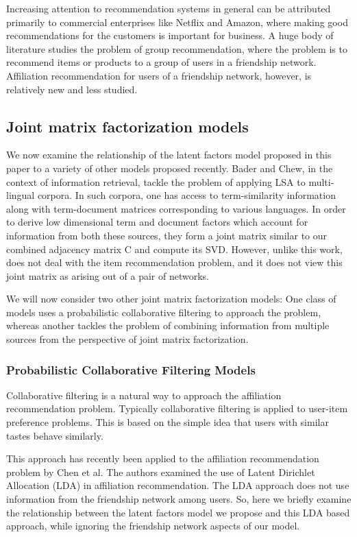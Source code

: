 Increasing attention to recommendation systems in general can be attributed primarily to commercial enterprises like Netflix and Amazon, where making good recommendations for the customers is important for business. A huge body of literature studies the problem of group recommendation, where the problem is to recommend items or products to a group of users in a friendship network.  Affiliation recommendation for users of a friendship network, however, is relatively new and less studied.

\subsection{Joint matrix factorization models}
We now examine the relationship of the latent factors model proposed in this paper to a variety of other models proposed recently. Bader and Chew\cite{baderChew08}, in the context of information retrieval, tackle the problem of applying LSA to multi-lingual corpora. In such corpora, one has access to term-similarity information along with term-document matrices corresponding to various languages. In order to derive low dimensional term and document factors which account for information from both these sources, they form a joint matrix similar to our combined adjacency matrix C and compute its SVD. However, unlike this work, \cite{baderChew08} does not deal with the item recommendation problem, and it does not view this joint matrix as arising out of a pair of networks.

We will now consider two other joint matrix factorization models: One class of models uses a probabilistic collaborative filtering to approach the problem, whereas another tackles the problem of combining information from multiple sources from the perspective of joint matrix factorization.

\subsubsection{Probabilistic Collaborative Filtering Models}
Collaborative filtering is a natural way to approach the affiliation recommendation problem. Typically collaborative filtering is applied to user-item preference problems. This is based on the simple idea that users with similar tastes behave similarly.

This approach has recently been applied to the affiliation recommendation problem by Chen et al\cite{GoogleCFLatent}. The authors examined the use of Latent Dirichlet Allocation (LDA) in affiliation recommendation. The LDA approach does not use information from the friendship network among users. So, here we briefly examine the relationship between the latent factors model we propose and this LDA based approach, while ignoring the friendship network aspects of our model.

